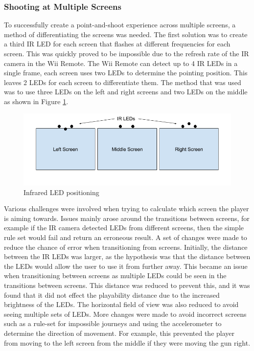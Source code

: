 \documentclass[a4paper,11pt]{article}
\begin{document}
\subsubsection{Shooting at Multiple Screens}
To successfully create a point-and-shoot experience across multiple screens, a method of differentiating the screens was needed. The first solution was to create a third IR LED for each screen that flashes at different frequencies for each screen. This was quickly proved to be impossible due to the refresh rate of the IR camera in the Wii Remote. The Wii Remote can detect up to 4 IR LEDs in a single frame, each screen uses two LEDs to determine the pointing position. This leaves 2 LEDs for each screen to differentiate them. The method that was used was to use three LEDs on the left and right screens and two LEDs on the middle as shown in Figure \ref{fig:led_pos}. 

\begin{figure}
	\centering
	\includegraphics[scale=0.5]{led_pos}
    \caption{Infrared LED positioning}
    \label{fig:led_pos}
\end{figure}

Various challenges were involved when trying to calculate which screen the player is aiming towards. Issues mainly arose around the transitions between screens, for example if the IR camera detected LEDs from different screens, then the simple rule set would fail and return an erroneous result. A set of changes were made to reduce the chance of error when transitioning from screens. Initially, the distance between the IR LEDs was larger, as the hypothesis was that the distance between the LEDs would allow the user to use it from further away. This became an issue when transitioning between screens as multiple LEDs could be seen in the transitions between screens. This distance was reduced to prevent this, and it was found that it did not effect the playability distance due to the increased brightness of the LEDs. The horizontal field of view was also reduced to avoid seeing multiple sets of LEDs. More changes were made to avoid incorrect screens such as a rule-set for impossible journeys and using the accelerometer to determine the direction of movement. For example, this prevented the player from moving to the left screen from the middle if they were moving the gun right. 
\end{document}

